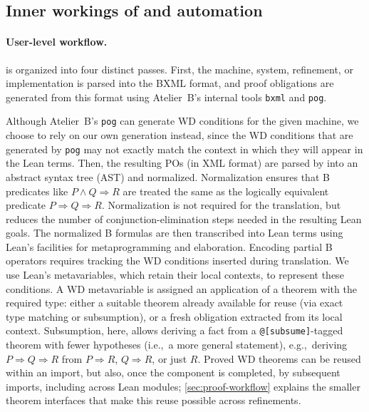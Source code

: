 \subsection{Inner workings of \barrel and automation}
\label{sec:innner-workings}

\paragraph*{User-level workflow.}

\barrel is organized into four distinct passes.
First, the machine, system, refinement, or implementation is parsed into the BXML format, and proof obligations are generated from this format using Atelier~B's internal tools \texttt{bxml} and \texttt{pog}.

Although Atelier~B's \texttt{pog} can generate WD conditions for the given machine, we choose to rely on our own generation instead, since the WD conditions that are generated by \texttt{pog} may not exactly match the context in which they will appear in the Lean terms.
Then, the resulting POs (in XML format) are parsed by \barrel into an abstract syntax tree (AST) and normalized.
Normalization ensures that B predicates like $P \land Q \Rightarrow R$ are treated the same as the logically equivalent predicate $P \Rightarrow Q \Rightarrow R$.
Normalization is not required for the translation, but reduces the number of conjunction-elimination steps needed in the resulting Lean goals.
The normalized B formulas are then transcribed into Lean terms using Lean's facilities for metaprogramming and elaboration.
Encoding partial B operators requires tracking the WD conditions inserted during translation.
We use Lean's metavariables, which retain their local contexts, to represent these conditions.
A WD metavariable is assigned an application of a theorem with the required type: either a suitable theorem already available for reuse (via exact type matching or subsumption), or a fresh obligation extracted from its local context.
Subsumption, here, allows deriving a fact from a \texttt{@[subsume]}-tagged theorem with fewer hypotheses (i.e.,\ a more general statement), e.g.,\ deriving \(P \Rightarrow Q \Rightarrow R\) from \(P \Rightarrow R\), \(Q \Rightarrow R\), or just \(R\).
Proved WD theorems can be reused within an import, but also, once the component is completed, by subsequent imports, including across Lean modules; \cref{sec:proof-workflow} explains the smaller theorem interfaces that make this reuse possible across refinements.
%
